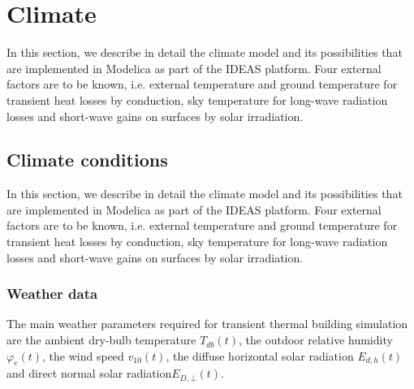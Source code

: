 
\chapter{Climate}





In this section, we describe in detail the climate model and its possibilities that are implemented in Modelica as part of the IDEAS platform. Four external factors are to be known, i.e. external temperature and ground temperature for transient heat losses by conduction, sky temperature for long-wave radiation losses and short-wave gains on surfaces by solar irradiation.


\section{Climate conditions}

In this section, we describe in detail the climate model and its possibilities that are implemented in Modelica as part of the IDEAS platform. Four external factors are to be known, i.e. external temperature and ground temperature for transient heat losses by conduction, sky temperature for long-wave radiation losses and short-wave gains on surfaces by solar irradiation.

\subsection{Weather data}
\label{chap:climwea}

The main weather parameters required for transient thermal building simulation are the ambient dry-bulb temperature $T_{db}(t)$, the outdoor relative humidity $\varphi_{e}(t)$, the wind speed $v_{10}(t)$, the diffuse horizontal solar radiation $E_{d,h}(t)$ and direct normal solar radiation$E_{D,\bot}(t)$. 

